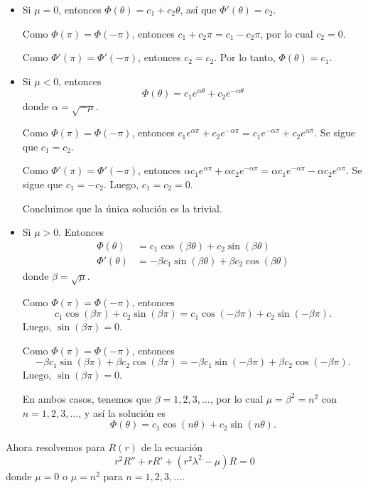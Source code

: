 \documentclass[11pt,letterpaper,draft]{report}
\theoremstyle{plain}
\theoremstyle{definition}
\theoremstyle{remark}
\newcommand\<{\langle}
\renewcommand\>{\rangle}
\begin{document}
\begin{itemize}
  \item
    Si $\mu=0$, entonces $\Phi(\theta)=c_1+c_2\theta$, así que
    $\Phi'(\theta)=c_2$.

    Como $\Phi(\pi)=\Phi(-\pi)$, entonces $c_1+c_2\pi=c_1-c_2\pi$,
    por lo cual $c_2=0$.
    
    Como $\Phi'(\pi)=\Phi'(-\pi)$, entonces $c_2=c_2$. Por
    lo tanto, $\Phi(\theta)=c_1$.
  
  \item
    Si $\mu<0$, entonces
    \[
       \Phi(\theta)
       =c_1e^{\alpha\theta}+
       c_2e^{-\alpha\theta}
    \]
    donde $\alpha=\sqrt{-\mu}$.

    Como $\Phi(\pi)=\Phi(-\pi)$, entonces
    $c_1e^{\alpha\pi}+c_2e^{-\alpha\pi}
    =c_1e^{-\alpha\pi}+c_2e^{\alpha\pi}$. Se sigue que
    $c_1=c_2$.

    Como $\Phi'(\pi)=\Phi'(-\pi)$, entonces
    $\alpha c_1e^{\alpha\pi}+\alpha c_2e^{-\alpha\pi}
    = \alpha c_1e^{-\alpha\pi}-\alpha c_2e^{\alpha\pi}$. Se
    sigue que $c_1=-c_2$. Luego, $c_1=c_2=0$.
    
    Concluimos que la única solución es la trivial.

  \item
    Si $\mu>0$. Entonces
    \begin{align*}
      \Phi(\theta) &=
      c_1\cos(\beta\theta)+c_2\sin(\beta\theta) \\
      \Phi'(\theta) &=
      -\beta c_1\sin(\beta\theta)+\beta c_2\cos(\beta\theta)
    \end{align*}
    donde $\beta=\sqrt\mu$.
    
    Como $\Phi(\pi)=\Phi(-\pi)$, entonces
    \[
      c_1\cos(\beta\pi)+c_2\sin(\beta\pi)
      =
      c_1\cos(-\beta\pi)+c_2\sin(-\beta\pi)
    .\]
    Luego, $\sin(\beta\pi)=0$.

    Como $\Phi(\pi)=\Phi(-\pi)$, entonces
    \[
      -\beta c_1\sin(\beta\pi)+\beta c_2\cos(\beta\pi)
      =
      -\beta c_1\sin(-\beta\pi)+\beta c_2\cos(-\beta\pi)
    .\]
    Luego, $\sin(\beta\pi)=0$.

    En ambos casos, tenemos que $\beta=1,2,3,\dots$, por lo
    cual $\mu=\beta^{2}=n^{2}$ con $n=1,2,3,\dots$, y así la solución es
    \[
      \Phi(\theta) = c_1\cos(n\theta) + c_2\sin(n\theta).
    \] 
    
\end{itemize}

\noindent Ahora resolvemos para $R(r)$ de la ecuación
\[
  r^{2}R'' +rR' +(r^{2}\lambda^{2}-\mu)R = 0
\]
donde $\mu=0$ o $\mu=n^{2}$ para $n=1,2,3,\dots$.
\end{document}

